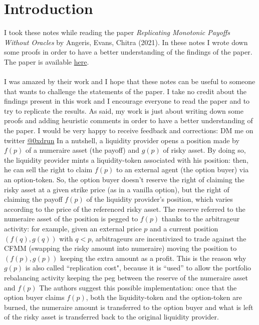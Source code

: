 \documentclass[12pt]{article}
\begin{document}
\section{Introduction}
\small
I took these notes while reading the paper \textit{Replicating Monotonic Payoffs Without Oracles} by Angeris, Evans, Chitra (2021).
In these notes I wrote down some proofs in order to have a better understanding of the findings of the paper.
The paper is available \href{https://arxiv.org/abs/2101.03356}{here}.
\\\\
I was amazed by their work and I hope that these notes can be useful to someone that wants to challenge the statements of the paper. I take no credit about the findings present in this work and I encourage everyone to read the paper and to try to replicate the results. As said, my work is just about writing down some proofs and adding heuristic comments in order to have a better understanding of the paper. I would be very happy to receive feedback and corrections: DM me on twitter \href{https://twitter.com/0xdrun}{@0xdrun}
\newline\newline
In a nutshell, a liquidity provider opens a position made by $f(p)$ of a numeraire asset (the payoff) and $g(p)$ of risky asset. \newline By doing so, the liquidity provider mints a liquidity-token associated with his position: then, he can sell the right to claim $f(p)$ to an external agent (the option buyer) via an option-token. So, the option buyer doesn't reserve the right of claiming the risky asset at a given strike price (as in a vanilla option), but the right of claiming the payoff $f(p)$ of the liquidity provider's position, which varies according to the price of the referenced risky asset. \newline
The reserve referred to the numeraire asset of the position is pegged to $f(p)$ thanks to the arbitrageur activity: for example, given an external price $p$ and a current position $(f(q),g(q))$ with $q<p$, arbitrageurs are incentivized to trade against the CFMM (swapping the risky amount into numeraire) moving the position to $(f(p),g(p))$ keeping the extra amount as a profit. This is the reason why $g(p)$ is also called ``replication cost", because it is ``used'' to allow the portfolio rebalancing activity keeping the peg between the reserve of the numeraire asset and $f(p)$
\newline
The authors suggest this possible implementation: once that the option buyer claims $f(p)$, both the liquidity-token and the option-token are burned, the numeraire amount is transferred to the option buyer and what is left of the risky asset is transferred back to the original liquidity provider.
\end{document}
